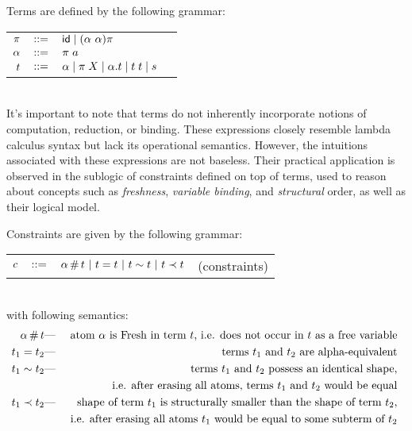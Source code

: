 \documentclass[english, mgr]{iithesis}
\begin{document}
Terms are defined by the following grammar:
\\
\begin{tabular}{rclr}
    $\pi$    & $::=$ & $\mathsf{id} \mid (\alpha\ \alpha) \pi$ \\
    $\alpha$ & $::=$ & $\pi \; a$ \\
    $t$    & $::=$ & $\alpha \mid \pi \; X \mid \alpha. t \mid t \; t \mid s$
\end{tabular}
\\

It's important to note that terms do not inherently incorporate notions of computation, reduction, or binding. These expressions closely resemble lambda calculus syntax but lack its operational semantics. However, the intuitions associated with these expressions are not baseless. Their practical application is observed in the sublogic of constraints defined on top of terms, used to reason about concepts such as \textit{freshness}, \textit{variable binding}, and \textit{structural} order, as well as their logical model.

Constraints are given by the following grammar:
\\
\begin{tabular}{rclr}
    $c$  & $::=$ & $\alpha \,\#\, t
                   \ |\  t = t
                   \ |\  t \sim t
                   \ |\  t \prec t$
        & (constraints)
\end{tabular}
\\
with following semantics:
\begin{eqnarray*}
  \alpha \,\#\, t & \text{---} & \text{
    atom $\alpha$ is {Fresh} in term $t$, i.e. does not occur in $t$
    as a free variable
  } \\
  t_1 = t_2 & \text{---} &\text{
    terms $t_1$ and $t_2$ are alpha-equivalent
  } \\
  t_1 \sim t_2 & \text{---} &\text{
    terms $t_1$ and $t_2$ possess an identical shape,
  } \\
  & & \text{
    i.e. after erasing all atoms, terms $t_1$ and $t_2$ would be equal
  } \\
  t_1 \prec t_2 & \text{---} &\text{
    shape of term $t_1$ is structurally smaller than the shape of term
    $t_2$,
  } \\
  & & \text{
    i.e. after erasing all atoms $t_1$ would be equal to some
    subterm of $t_2$
  } \\
\end{eqnarray*}
\end{document}
